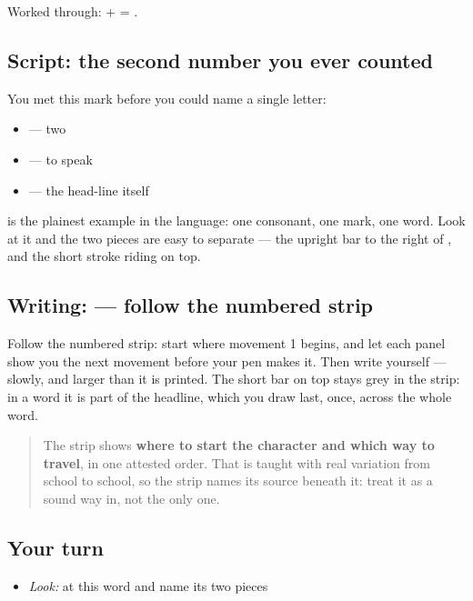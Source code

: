 Worked through: \textbf{} + \textbf{} = \textbf{}.

\subsection*{Script: the second number you ever counted}
You met this mark before you could name a single letter:

\begin{itemize}
\raggedright
  \item \textbf{} — two
  \item \textbf{} — to speak
  \item \textbf{} — the head-line itself
\end{itemize}

\textbf{} is the plainest example in the language: one consonant, one mark, one word. Look at it and the two pieces are easy to separate — the upright bar to the right of \textbf{}, and the short stroke riding on top.

\subsection*{Writing:  — follow the numbered strip}

Follow the numbered strip: start where movement 1 begins, and let each panel show you the next movement before your pen makes it. Then write \textbf{} yourself — slowly, and larger than it is printed. The short bar on top stays grey in the strip: in a word it is part of the headline, which you draw last, once, across the whole word.

\begin{quote}
The strip shows \textbf{where to start the character and which way to travel}, in one attested order. That is taught with real variation from school to school, so the strip names its source beneath it: treat it as a sound way in, not the only one.
\end{quote}

\subsection*{Your turn}
\begin{itemize}
\raggedright
  \item \emph{Look:} at this word and name its two pieces
\end{itemize}

